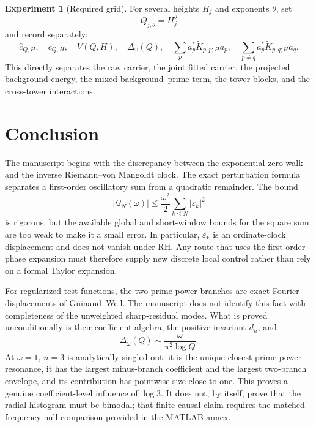\documentclass[11pt]{amsart}
\numberwithin{equation}{section}
\theoremstyle{plain}
\theoremstyle{definition}
\newtheorem{experiment}[theorem]{Experiment}
\theoremstyle{remark}
\newcommand{\1}{\mathbf{1}}
\begin{document}
\begin{experiment}[Required grid]
\label{exp:required_height_cutoff_grid}
For several heights $H_j$ and exponents $\theta$, set
\begin{equation}
Q_{j,\theta}=H_j^\theta
\label{eq:numerical_Q_theta_grid}
\end{equation}
and record separately:
\begin{equation}
\widehat c_{Q,H},
\quad
c_{Q,H},
\quad
V(Q,H),
\quad
\Delta_\omega(Q),
\quad
\sum_p a_p^\ast\widetilde K_{p,p;H}a_p,
\quad
\sum_{p\neq q}a_p^\ast\widetilde K_{p,q;H}a_q.
\label{eq:numerical_required_grid_outputs}
\end{equation}
This directly separates the raw carrier, the joint fitted carrier, the
projected background energy, the mixed background--prime term, the tower
blocks, and the cross-tower interactions.
\end{experiment}



\section{Conclusion}
\label{sec:conclusion}

The manuscript begins with the discrepancy between the exponential zero walk
and the inverse Riemann--von Mangoldt clock.  The exact perturbation formula
separates a first-order oscillatory sum from a quadratic remainder.  The
bound
\begin{equation}
|\mathcal Q_N(\omega)|
\leq
\frac{\omega^2}{2}\sum_{k\leq N}|\varepsilon_k|^2
\label{eq:conclusion_phase_remainder}
\end{equation}
is rigorous, but the available global and short-window bounds for the square
sum are too weak to make it a small error.  In particular,
$\varepsilon_k$ is an ordinate-clock displacement and does not vanish under
RH.  Any route that uses the first-order phase expansion must therefore
supply new discrete local control rather than rely on a formal Taylor
expansion.

For regularized test functions, the two prime-power branches are exact
Fourier displacements of Guinand--Weil.  The manuscript does not identify
this fact with completeness of the unweighted sharp-residual modes.  What is
proved unconditionally is their coefficient algebra, the positive invariant
$d_n$, and
\begin{equation}
\Delta_\omega(Q)
\sim
\frac{\omega}{\pi^2\log Q}.
\label{eq:conclusion_Delta}
\end{equation}
At $\omega=1$, $n=3$ is analytically singled out: it is the unique closest
prime-power resonance, it has the largest minus-branch coefficient and the
largest two-branch envelope, and its contribution has pointwise size close
to one.  This proves a genuine coefficient-level influence of $\log3$.
It does not, by itself, prove that the radial histogram must be bimodal; that
finite causal claim requires the matched-frequency null comparison provided
in the MATLAB annex.
\end{document}
